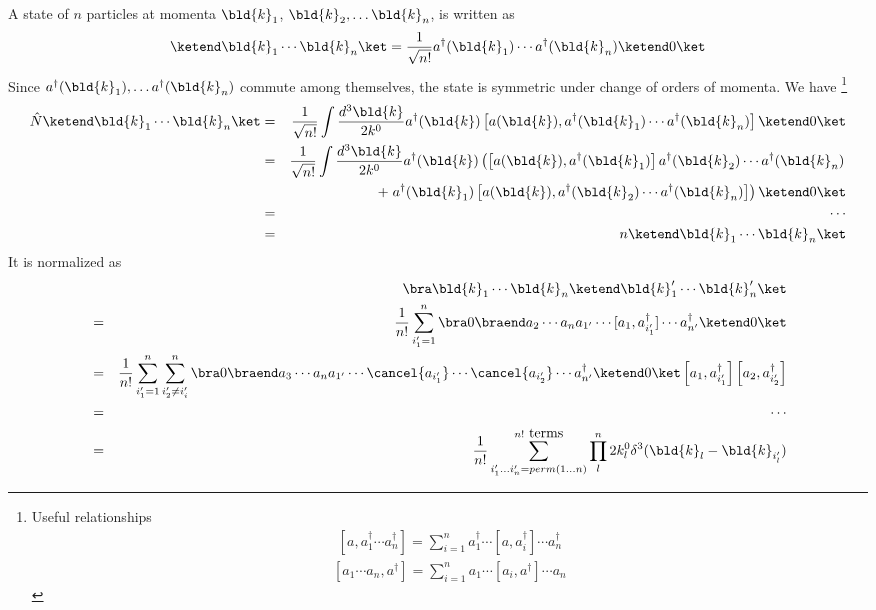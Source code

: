 A state of $n$ particles at momenta $\bld{k}_1$, $\bld{k}_2, \dots \bld{k}_n$,  
is written as
\begin{eqnarray*}
\ketend \bld{k}_1 \cdots \bld{k}_n \ket
=
\frac{1}{\sqrt{n!}}
a^{\dagger}(\bld{k}_1) \cdots a^{\dagger}(\bld{k}_n)
\ketend 0 \ket
\end{eqnarray*}
Since $a^{\dagger}(\bld{k}_1), \dots a^{\dagger}(\bld{k}_n)$
commute among themselves, the state is symmetric under
change of orders of momenta.
We have
\footnote{%
Useful relationships
\begin{eqnarray*}
\left[
a, a_1^\dagger \cdots a_n^\dagger
\right]
=
\sum_{i=1}^n
a_1^\dagger \cdots [a, a_i^\dagger] \cdots a_n^\dagger
\end{eqnarray*}
\begin{eqnarray*}
\left[
a_1 \cdots a_n, a^\dagger
\right]
=
\sum_{i=1}^n
a_1 \cdots [a_i, a^\dagger] \cdots a_n
\end{eqnarray*}

}%
\begin{eqnarray*}
\hat{N} \ketend \bld{k}_1 \cdots \bld{k}_n \ket
&=&
\frac{1}{\sqrt{n!}}
 \int \frac{d^3 \bld{k}}{2k^0} a^\dagger(\bld{k}) 
 \left[ a(\bld{k}), 
a^{\dagger}(\bld{k}_1) \cdots a^{\dagger}(\bld{k}_n)
\right]
\ketend 0 \ket
 \\
&=&
\frac{1}{\sqrt{n!}}
 \int \frac{d^3 \bld{k}}{2k^0} a^\dagger(\bld{k}) 
 \left(
 \left[ a(\bld{k}), 
a^{\dagger}(\bld{k}_1)
\right]
a^{\dagger}(\bld{k}_2) \cdots a^{\dagger}(\bld{k}_n)
\right.
\\
&&+
\left.
a^{\dagger}(\bld{k}_1)
 \left[ a(\bld{k}), 
a^{\dagger}(\bld{k}_2) \cdots a^{\dagger}(\bld{k}_n)
\right]
\right)
\ketend 0 \ket
 \\
&=&
\cdots
 \\
&=&
n \ketend \bld{k}_1 \cdots \bld{k}_n \ket
\end{eqnarray*}
It is normalized as
\begin{eqnarray}
&&\bra \bld{k}_1 \cdots \bld{k}_n 
\ketend \bld{k}'_1 \cdots \bld{k}'_n \ket
\nonumber\\
&=&
\frac{1}{n!}
\sum_{i'_1 = 1}^n
\bra 0 \braend
a_2 \cdots a_{n} a_{1'} \cdots [a_1, a_{i'_1}^\dagger ] \cdots a_{n'}^\dagger
\ketend 0 \ket
\nonumber\\
&=&
\frac{1}{n!}
\sum_{i'_1 = 1}^n
\sum_{i'_2 \neq i'_i}^n
\bra 0 \braend
a_3 \cdots a_{n} a_{1'} \cdots \cancel{a_{i'_1}} \cdots \cancel{a_{i'_2}} \cdots a_{n'}^\dagger
\ketend 0 \ket 
\left[ a_1, a_{i'_1}^\dagger \right]
\left[ a_2, a_{i'_2}^\dagger \right]
\nonumber\\
&=&
\cdots
\nonumber\\
&=&
\frac{1}{n!}
\sum_{i'_1 \dots i'_n = perm(1\dots n)}^{n! \mbox{ terms}}
\prod_{l}^n
2 k_l^0 \delta^3 (\bld{k}_l - \bld{k}_{i'_l})
\label{eqn:nscalarnorm}
\end{eqnarray}
